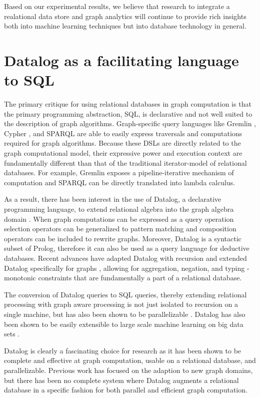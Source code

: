 \documentclass[11pt,letterpaper]{article}
\begin{document}
Based on our experimental results, we believe that research to integrate a realational data store and graph analytics will continue to provide rich insights both into machine learning techniques but into database technology in general.

\section*{Datalog as a facilitating language to SQL}

The primary critique for using relational databases in graph computation is that the primary programming abstraction, SQL, is declarative and not well suited to the description of graph algorithms. Graph-specific query languages like Gremlin \cite{rodriguez_gremlin_2013}, Cypher \cite{miller_graph_2013}, and SPARQL \cite{prudhommeaux_sparql_2008} are able to easily express traversals and computations required for graph algorithms. Because these DSLs are directly related to the graph computational model, their expressive power and execution context are fundamentally different than that of the traditional iterator-model of relational databases. For example, Gremlin exposes a pipeline-iterative mechanism of computation and SPARQL can be directly translated into lambda calculus.

As a result, there has been interest in the use of Datalog, a declarative programming language, to extend relational algebra into the graph algebra domain \cite{he_graphs-at--time:_2008}. When graph computations can be expressed as a query operation selection operators can be generalized to pattern matching and composition operators can be included to rewrite graphs. Moreover, Datalog is a syntactic subset of Prolog, therefore it can also be used as a query language for deductive databases. Recent advances have adapted Datalog with recursion and extended Datalog specifically for graphs \cite{shkapsky_graph_2013,green_datalog_2013}, allowing for aggregation, negation, and typing - monotonic constraints that are fundamentally a part of a relational database.

The conversion of Datalog queries to SQL queries, thereby extending relational processing with graph aware processing is not just isolated to recursion on a single machine, but has also been shown to be parallelizable \cite{seo_distributed_2013}. Datalog has also been shown to be easily extensible to large scale machine learning on big data sets \cite{bu_scaling_2012}.

Datalog is clearly a fascinating choice for research as it has been shown to be complete and effective at graph computation, usable on a relational database, and parallelizable. Previous work has focused on the adaption to new graph domains, but there has been no complete system where Datalog augments a relational database in a specific fashion for both parallel and efficient graph computation.
\end{document}
